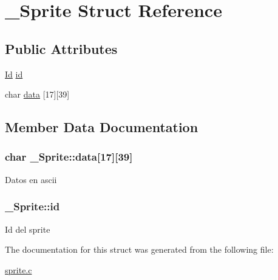 \hypertarget{struct__Sprite}{}\section{\+\_\+\+Sprite Struct Reference}
\label{struct__Sprite}
\subsection*{Public Attributes}
\begin{DoxyCompactItemize}
\item 
\hyperlink{types_8h_a845e604fb28f7e3d97549da3448149d3}{Id} \hyperlink{struct__Sprite_ade53af91be4735711bed7748f69fbc2a}{id}
\item 
char \hyperlink{struct__Sprite_add6396519e5c35e3e0d04d8519d5e6c2}{data} \mbox{[}17\mbox{]}\mbox{[}39\mbox{]}
\end{DoxyCompactItemize}


\subsection{Member Data Documentation}
\subsubsection[{\texorpdfstring{data}{data}}]{\setlength{\rightskip}{0pt plus 5cm}char \+\_\+\+Sprite\+::data\mbox{[}17\mbox{]}\mbox{[}39\mbox{]}}\hypertarget{struct__Sprite_add6396519e5c35e3e0d04d8519d5e6c2}{}\label{struct__Sprite_add6396519e5c35e3e0d04d8519d5e6c2}
Datos en ascii 
\subsubsection[{\texorpdfstring{id}{id}}]{ \+\_\+\+Sprite\+::id}\hypertarget{struct__Sprite_ade53af91be4735711bed7748f69fbc2a}{}\label{struct__Sprite_ade53af91be4735711bed7748f69fbc2a}
Id del sprite 

The documentation for this struct was generated from the following file\+:\begin{DoxyCompactItemize}
\item 
\hyperlink{sprite_8c}{sprite.\+c}\end{DoxyCompactItemize}
